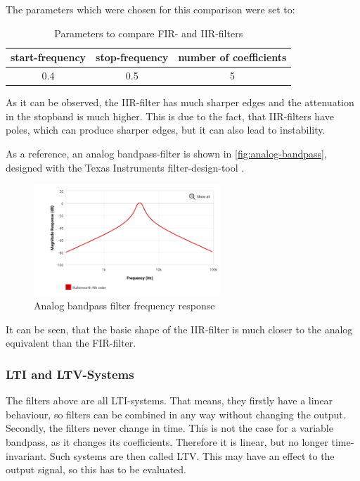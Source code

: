 The parameters which were chosen for this comparison were set to:

\begin{table}[!h]
    \centering
    \caption{Parameters to compare \ac{FIR}- and \ac{IIR}-filters}
    \label{table:compare-filters}
    \begin{tabular}{c | c | c }
        start-frequency & stop-frequency & number of coefficients \\
        \hline
        0.4 & 0.5 & 5
    \end{tabular}
\end{table}

As it can be observed, the \ac{IIR}-filter has much sharper edges and the attenuation in the stopband is much higher.
This is due to the fact, that \ac{IIR}-filters have poles, which can produce sharper edges, but it can also lead to
instability.

As a reference, an analog bandpass-filter is shown in \autoref{fig:analog-bandpass}, designed with the Texas Instruments
filter-design-tool \cite{TI-filterdesign-tool}.

\begin{figure}[!h]
    \centering
    \includegraphics[width=7cm]{img/analog_bandpass.png}
    \caption{Analog bandpass filter frequency response}
    \label{fig:analog-bandpass}
\end{figure}

It can be seen, that the basic shape of the \ac{IIR}-filter is much closer to the analog equivalent than the
\ac{FIR}-filter.

\subsubsection{LTI and LTV-Systems}

The filters above are all \ac{LTI}-systems. That means, they firstly have a linear behaviour, so filters can be
combined in any way without changing the output. Secondly, the filters never change in time.
This is not the case for a variable bandpass, as it changes its coefficients. Therefore it is linear, but no
longer time-invariant. Such systems are then called \ac{LTV}.
This may have an effect to the output signal, so this has to be evaluated.

